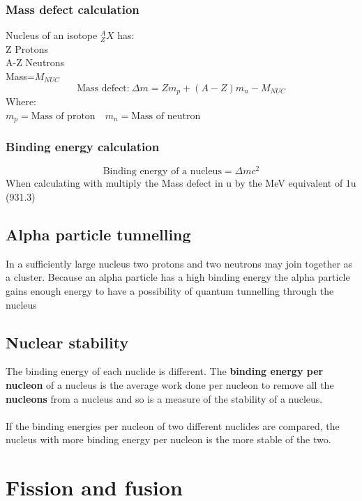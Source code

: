\documentclass{article}[18pt]
\begin{document}
\subsubsection{Mass defect calculation}
Nucleus of an isotope $^A_ZX$ has:\\
Z Protons\\
A-Z Neutrons\\
Mass=$M_{NUC}$
$$\textrm{Mass defect:} \ \Delta m=Zm_p+(A-Z)m_n-M_{NUC}$$
Where:\\
$m_p=\textrm{Mass of proton} \quad m_n=\textrm{Mass of neutron}$
\subsubsection{Binding energy calculation}
$$\textrm{Binding energy of a nucleus}=\Delta mc^2$$
When calculating with multiply the Mass defect in u by the MeV equivalent of 1u (931.3)
\subsection{Alpha particle tunnelling}
In a sufficiently large nucleus two protons and two neutrons may join together as a cluster. Because an alpha particle has a high binding energy the alpha particle gains enough energy to have a possibility of quantum tunnelling through the nucleus
\subsection{Nuclear stability}
The binding energy of each nuclide is different. The \textbf{binding energy per nucleon} of a nucleus is the average work done per nucleon to remove all the \textbf{nucleons} from a nucleus and so is a measure of the stability of a nucleus.\\
\\
If the binding energies per nucleon of two different nuclides are compared, the nucleus with more binding energy per nucleon is the more stable of the two.
\newpage
\section{Fission and fusion}
\end{document}
